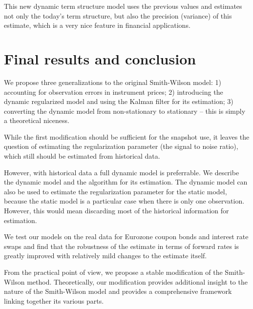 \documentclass[a4paper]{iccf2017}
\begin{document}
This new dynamic term structure model uses the previous values and estimates not only the today's term structure, but also the precision (variance) of this estimate, which is a very nice feature in financial applications.

\section{Final results and conclusion}
We propose three generalizations to the original Smith-Wilson model: 1) accounting for observation errors in instrument prices; 2) introducing the dynamic regularized model and using the Kalman filter for its estimation; 3) converting the dynamic model from non-stationary to stationary -- this is simply a theoretical niceness.

While the first modification should be sufficient for the snapshot use, it leaves the question of estimating the regularization parameter (the signal to noise ratio), which still should be estimated from historical data.

However, with historical data a full dynamic model is preferrable. We describe the dynamic model and the algorithm for its estimation. The dynamic model can also be used to estimate the regularization parameter for the static model, because the static model is a particular case when there is only one observation. However, this would mean discarding most of the historical information for estimation.

We test our models on the real data for Eurozone coupon bonds and interest rate swaps and find that the robustness of the estimate in terms of forward rates is greatly improved with relatively mild changes to the estimate itself.

From the practical point of view, we propose a stable modification of the Smith-Wilson method. Theoretically, our modification provides additional insight to the nature of the Smith-Wilson model and provides a comprehensive framework linking together its various parts.
\end{document}
